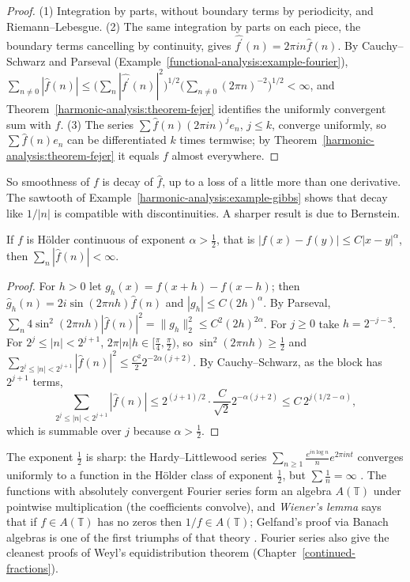 \begin{proof}
(1) Integration by parts, without boundary terms by periodicity, and Riemann--Lebesgue. (2) The same integration by parts on each piece, the boundary terms cancelling by continuity, gives
$\widehat{f^{\prime}}(n) = 2\pi in\hat f(n)$. By Cauchy--Schwarz and Parseval (Example~\ref{functional-analysis:example-fourier}),
$\sum_{n \neq 0}|\hat f(n)| \leq \bigl(\sum_n|\widehat{f^{\prime}}(n)|^2\bigr)^{1/2}\bigl(\sum_{n \neq 0}(2\pi n)^{-2}\bigr)^{1/2} < \infty$, and Theorem~\ref{harmonic-analysis:theorem-fejer} identifies the uniformly convergent sum with $f$.
(3) The series $\sum\hat f(n)(2\pi in)^je_n$, $j \leq k$, converge uniformly, so $\sum\hat f(n)e_n$ can be differentiated $k$ times termwise; by Theorem~\ref{harmonic-analysis:theorem-fejer} it equals $f$ almost everywhere.
\end{proof}

So smoothness of $f$ is decay of $\hat f$, up to a loss of a little more than one derivative. The sawtooth of Example~\ref{harmonic-analysis:example-gibbs} shows that decay like $1/|n|$ is compatible with discontinuities.
A sharper result is due to Bernstein.

\begin{theorem}[Bernstein]\label{harmonic-analysis:theorem-bernstein}
If $f$ is H\"older continuous of exponent $\alpha > \frac12$, that is $|f(x) - f(y)| \leq C|x - y|^\alpha$, then $\sum_n|\hat f(n)| < \infty$.
\end{theorem}

\begin{proof}
For $h > 0$ let $g_h(x) = f(x + h) - f(x - h)$; then $\hat g_h(n) = 2i\sin(2\pi nh)\hat f(n)$ and $|g_h| \leq C(2h)^\alpha$. By Parseval, $\sum_n4\sin^2(2\pi nh)|\hat f(n)|^2 = \|g_h\|_2^2 \leq C^2(2h)^{2\alpha}$.
For $j \geq 0$ take $h = 2^{-j-3}$. For $2^j \leq |n| < 2^{j+1}$, $2\pi|n|h \in [\frac\pi4, \frac\pi2)$, so $\sin^2(2\pi nh) \geq \frac12$ and $\sum_{2^j \leq |n| < 2^{j+1}}|\hat f(n)|^2 \leq \frac{C^2}{2}2^{-2\alpha(j+2)}$. By
Cauchy--Schwarz, as the block has $2^{j+1}$ terms,
\[
\sum_{2^j \leq |n| < 2^{j+1}}|\hat f(n)| \leq 2^{(j+1)/2}\cdot\frac{C}{\sqrt2}2^{-\alpha(j+2)} \leq C\,2^{j(1/2 - \alpha)},
\]
which is summable over $j$ because $\alpha > \frac12$.
\end{proof}

\begin{remark}\label{harmonic-analysis:remark-bernstein-sharp}
The exponent $\frac12$ is sharp: the Hardy--Littlewood series $\sum_{n \geq 1}\frac{e^{in\log n}}{n}e^{2\pi int}$ converges uniformly to a function in the H\"older class of exponent $\frac12$, but $\sum\frac1n = \infty$
\cite{zygmund-trigonometric}. The functions with absolutely convergent Fourier series form an algebra $A(\mathbb{T})$ under pointwise multiplication (the coefficients convolve), and \emph{Wiener's lemma} says that if $f \in A(\mathbb{T})$
has no zeros then $1/f \in A(\mathbb{T})$; Gelfand's proof via Banach algebras is one of the first triumphs of that theory \cite{katznelson-harmonic}. Fourier series also give the cleanest proofs of Weyl's equidistribution
theorem (Chapter~\ref{continued-fractions}).
\end{remark}

